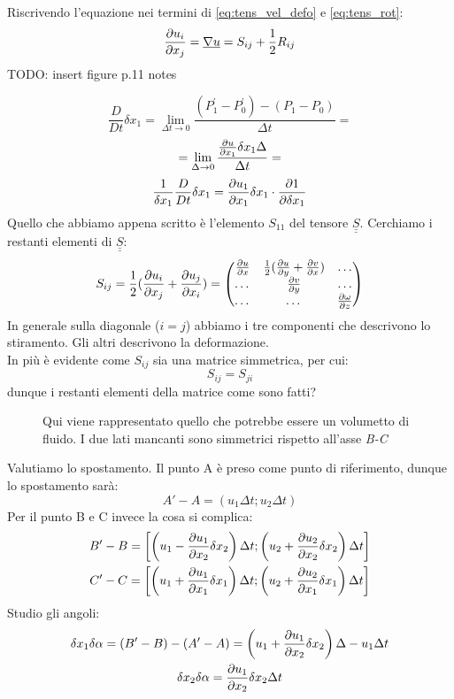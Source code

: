 Riscrivendo l'equazione nei termini di \cref{eq:tens_vel_defo} e \cref{eq:tens_rot}:
\begin{equation}
  \frac{\partial u_i}{\partial x_j}=\underline{\nabla}\underline{u}=S_{ij}+ \frac{1}{2}R_{ij}
\end{equation}
TODO: insert figure p.11 notes

\[
\frac{D}{Dt} \delta x_1= \lim_{\Delta t\to0} \frac{(P_1^{'}-P_0^{'})-(P_1-P_0)}{\Delta t}=
\]
\[
= \lim_{\Delta \to0} \frac{\frac{\partial u}{\partial x_1}\delta x_1 \Delta}{\Delta t}= 
\]
\[
\frac{1}{\delta x_1}\frac{D}{Dt}\delta x_1=\frac{\partial u_1}{\partial x_1}\delta x_1\cdot \frac{\partial1}{\partial\delta x_1}
\]
Quello che abbiamo appena scritto è l'elemento $ S_{11} $ del tensore $ \underline{\underline{S}} $.
Cerchiamo i restanti elementi di $ \underline{\underline{S}} $:
\[
  S_{ij} = \frac{1}{2}(\frac{\partial u_i}{\partial x_j}+\frac{\partial u_j}{\partial x_i}) =
  \begin{pmatrix}
    \frac{\partial u}{\partial x} & \frac{1}{2}(\frac{\partial u}{\partial y}+\frac{\partial v}{\partial x}) & \dots \\
    \dots & \frac{\partial v}{\partial y} & \dots \\
    \dots & \dots & \frac{\partial\omega }{\partial z}
  \end{pmatrix}
\]
In generale sulla diagonale ($ i=j $) abbiamo i tre componenti che descrivono lo stiramento. Gli altri descrivono la deformazione.\\
In più è evidente come $ S_{ij} $ sia una matrice simmetrica, per cui:
\[
S_{ij} = S_{ji}
\]
dunque i restanti elementi della matrice come sono fatti?
\begin{figure}[H]
    \centering
    \caption{Qui viene rappresentato quello che potrebbe essere un volumetto di fluido. I due lati mancanti sono simmetrici rispetto all'asse \textit{B-C}}
    \label{fig:vol_spostato}
\end{figure}
Valutiamo lo spostamento.
Il punto A è preso come punto di riferimento, dunque lo spostamento sarà:
\[
A'-A = (u_1\Delta t; u_2\Delta t)
\]
Per il punto B e C invece la cosa si complica:
\begin{gather*}
  B' -B = \left[\left(u_1-\frac{\partial u_1}{\partial x_2}\delta x_2\right) \Delta t; \left(u_2+\frac{\partial u_2}{\partial x_2}\delta x_2\right)\Delta t\right]\\
  C' -C = \left[\left(u_1+\frac{\partial u_1}{\partial x_1}\delta x_1\right)\Delta t;\left(u_2+\frac{\partial u_2}{\partial x_1}\delta x_1\right)\Delta t\right]
\end{gather*}
Studio gli angoli:
\begin{gather*}
  \delta x_1\delta \alpha =(B' -B) - (A' -A) = \left(u_1+\frac{\partial u_1}{\partial x_2}\delta x_2\right)\Delta -u_1\Delta t\\
  \delta x_2\delta \alpha =\frac{\partial u_1}{\partial x_2}\delta x_2\Delta t
\end{gather*}
